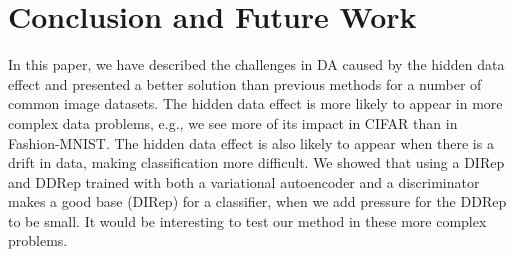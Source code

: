 \documentclass{article}
\newcommand{\comment}[1]{}
\newcommand\todo[1]{\textcolor{red}{#1}}
\newcommand{\remove}[1]{}
\begin{document}
\section{Conclusion and Future Work}
\label{Conclusion and Future Work}
%



In this paper, %
we have described the challenges in DA caused by the hidden data effect and presented a better solution than previous methods for a number of common image datasets. The hidden data effect is more likely to appear in more complex data problems, e.g., we see more of its impact in CIFAR than in Fashion-MNIST. The hidden data effect is also likely to appear when there is a drift in data, making classification more difficult. 
\comment{For example, early papers on spam \cite{spam} described specific characteristics that enabled spam to be recognized. It is unlikely that more sophisticated spammers still provide those characteristics, but some less sophisticated ones may. It is expensive to label messages as spam or not spam, and it would be beneficial to be able to use an old set of labels to train a system to handle new messages. Our \verb"VAEGAN" algorithm allows exactly that.} We showed that using a DIRep and DDRep trained with both a variational autoencoder and a discriminator makes a good base (DIRep) for a classifier, when we add pressure for the DDRep to be small. It would be interesting to test our method in these more complex problems.

\end{document}
